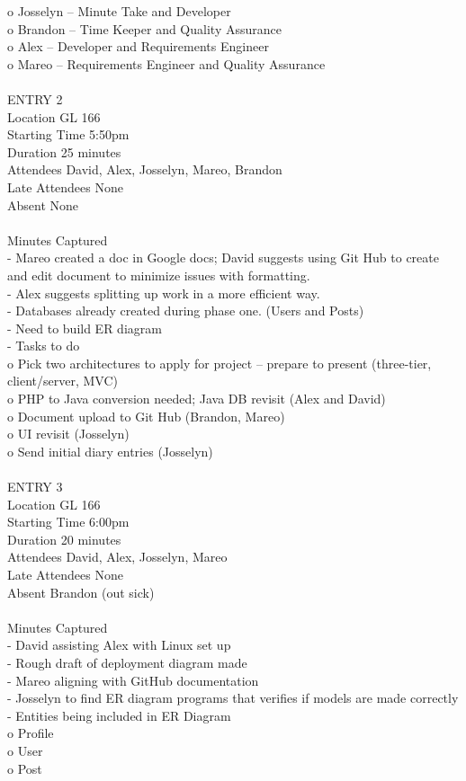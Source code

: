 \documentclass{report}
\begin{document}
o	Josselyn – Minute Take and Developer\\
o	Brandon – Time Keeper and Quality Assurance\\
o	Alex – Developer and Requirements Engineer\\
o	Mareo – Requirements Engineer and Quality Assurance\\
\\
ENTRY 2\\	
Location		GL 166\\
Starting Time		5:50pm\\
Duration		25 minutes\\
Attendees		David, Alex, Josselyn, Mareo, Brandon\\
Late Attendees	None\\
Absent		None\\
\\
Minutes Captured\\
-	Mareo created a doc in Google docs; David suggests using Git Hub to create and edit document to minimize issues with formatting.\\
-	Alex suggests splitting up work in a more efficient way.\\
-	Databases already created during phase one. (Users and Posts)\\
-	Need to build ER diagram\\
-	Tasks to do\\
o	Pick two architectures to apply for project – prepare to present (three-tier, client/server, MVC)\\
o	PHP to Java conversion needed; Java DB revisit (Alex and David)\\
o	Document upload to Git Hub (Brandon, Mareo)\\
o	UI revisit (Josselyn)\\
o	Send initial diary entries (Josselyn)\\
\\
ENTRY 3\\	
Location		GL 166\\
Starting Time		6:00pm\\
Duration		20 minutes\\
Attendees		David, Alex, Josselyn, Mareo\\
Late Attendees	None\\
Absent		Brandon (out sick)\\
\\
Minutes Captured\\
-	David assisting Alex with Linux set up\\
-	Rough draft of deployment diagram made\\
-	Mareo aligning with GitHub documentation\\
-	Josselyn to find ER diagram programs that verifies if models are made correctly\\
-	Entities being included in ER Diagram\\
o	Profile\\
o	User\\
o	Post\\
\end{document}
